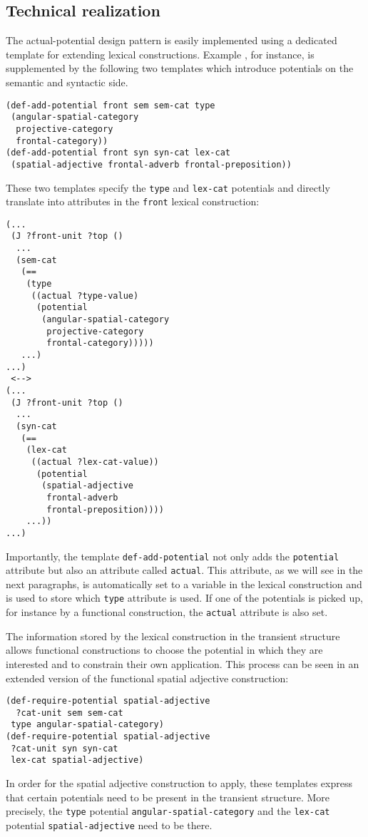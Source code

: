 \subsection{Technical realization}
The actual-potential design pattern is easily implemented
using a dedicated template for extending lexical constructions.
Example , for instance, is supplemented by the following two 
templates which introduce potentials on the semantic and syntactic side.
\ea
\label{e:def-lex-front-potentials}
\begin{lstlisting}
(def-add-potential front sem sem-cat type 
 (angular-spatial-category 
  projective-category 
  frontal-category))
(def-add-potential front syn syn-cat lex-cat 
 (spatial-adjective frontal-adverb frontal-preposition))
\end{lstlisting}
\z
These two templates specify the {\footnotesize\tt type} and 
{\footnotesize\tt lex-cat} potentials and directly translate into 
attributes in the {\footnotesize\tt front} lexical construction:
\ea
\label{e:def-lex-front-cxn}
\begin{lstlisting}
(...
 (J ?front-unit ?top ()
  ...
  (sem-cat 
   (== 
    (type 
     ((actual ?type-value)
      (potential 
       (angular-spatial-category 
        projective-category 
        frontal-category)))))
   ...)
...)
 <-->
(...
 (J ?front-unit ?top ()
  ...
  (syn-cat 
   (== 
    (lex-cat
     ((actual ?lex-cat-value))
      (potential 
       (spatial-adjective 
        frontal-adverb 
        frontal-preposition))))
    ...))
...)
\end{lstlisting}
\z
Importantly, the template {\footnotesize\tt def-add-potential} 
not only adds the {\footnotesize\tt potential} attribute but also an 
attribute called {\footnotesize\tt actual}. This attribute, as we will
see in the next paragraphs, is automatically set to a variable 
in the lexical construction and is used to store which 
{\footnotesize\tt type} attribute is used. If one of the potentials 
is picked up, for instance by a functional construction, the 
{\footnotesize\tt actual} attribute is also set.

The information stored by the lexical construction in the transient structure
allows functional constructions to choose 
the potential in which they are interested and to constrain
their own application. This process can be seen in an extended 
version of the functional spatial adjective construction:
\ea
\begin{lstlisting}
(def-require-potential spatial-adjective 
  ?cat-unit sem sem-cat 
 type angular-spatial-category)
(def-require-potential spatial-adjective 
 ?cat-unit syn syn-cat
 lex-cat spatial-adjective)
\end{lstlisting}
\z
In order for the spatial adjective 
construction to apply, these templates express that certain potentials need to be present in the 
transient structure. More precisely, the {\footnotesize\tt type} potential 
{\footnotesize\tt angular-spatial-category} and the {\footnotesize\tt lex-cat} potential 
{\footnotesize\tt spatial-adjective} need to be there. 

